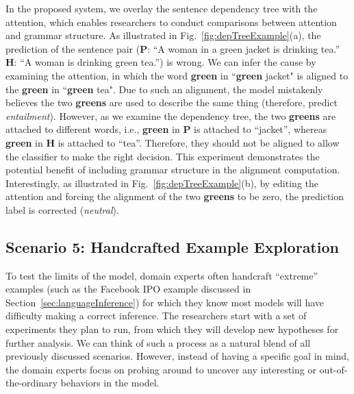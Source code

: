 In the proposed system, we overlay the sentence dependency tree with the attention, which enables researchers to conduct comparisons between attention and grammar structure.
As illustrated in Fig.~\ref{fig:depTreeExample}(a), the prediction of the sentence pair (\textbf{P}: ``A woman in a green jacket is drinking tea.'' \textbf{H}: ``A woman is drinking green tea.'') is wrong. We can infer the cause by examining the attention, in which the word \textbf{green} in ``\textbf{green} jacket" is aligned to the \textbf{green} in ``\textbf{green} tea". Due to such an alignment, the model mistakenly believes the two \textbf{greens} are used to describe the same thing (therefore, predict \emph{entailment}).  However, as we examine the dependency tree, the two \textbf{greens} are attached to different words, i.e., \textbf{green} in \textbf{P} is attached to ``jacket'', whereas \textbf{green} in \textbf{H} is attached to ``tea''. Therefore, they should not be aligned to allow the classifier to make the right decision.
%
This experiment demonstrates the potential benefit of including grammar structure in the alignment computation. %
%
Interestingly, as illustrated in Fig.~\ref{fig:depTreeExample}(b), by editing the attention and forcing the alignment of the two \textbf{greens} to be zero, the prediction label is corrected (\emph{neutral}).

\subsection{Scenario 5: Handcrafted Example Exploration}
To test the limits of the model, domain experts often handcraft ``extreme'' examples (such as the Facebook IPO example discussed in Section~\ref{sec:languageInference}) for which they know most models will have difficulty making a correct inference.
%
The researchers start with a set of experiments they plan to run, from which they will develop new hypotheses for further analysis.
%
We can think of such a process as a natural blend of all previously discussed scenarios. However, instead of having a specific goal in mind, the domain experts focus on probing around to uncover any interesting or out-of-the-ordinary behaviors in the model.
%


